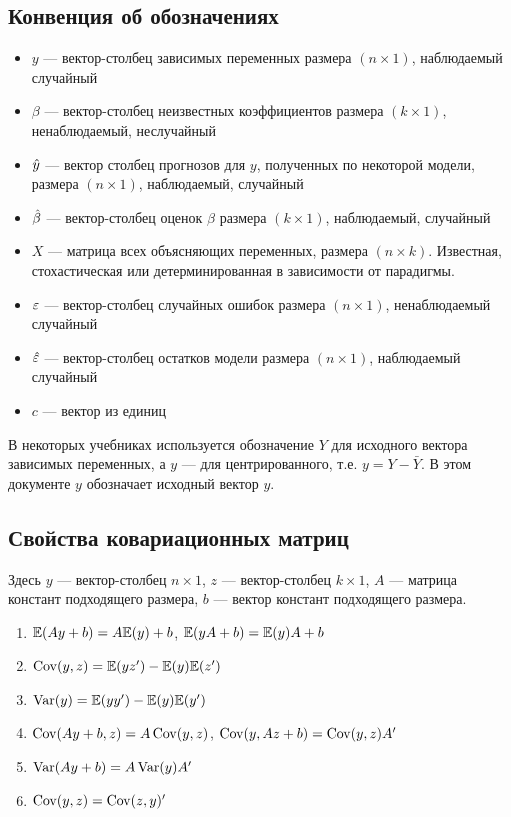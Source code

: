 \documentclass[12pt, a4paper]{article}
\begin{document}
\subsection{Конвенция об обозначениях}

\begin{itemize}
\item $y$ — вектор-столбец зависимых переменных размера $(n \times 1)$, наблюдаемый случайный

\item $\beta$ — вектор-столбец неизвестных коэффициентов размера $(k \times 1)$, ненаблюдаемый, неслучайный

\item $\hat{y}$ — вектор столбец прогнозов для $y$, полученных по некоторой модели, размера $(n \times 1)$, наблюдаемый, случайный

\item $\hat{\beta}$ — вектор-столбец оценок $\beta$ размера $(k \times 1)$, наблюдаемый, случайный

\item $X$ — матрица всех объясняющих переменных, размера $(n \times k)$. Известная, стохастическая или детерминированная в зависимости от парадигмы.

\item $\varepsilon$ — вектор-столбец случайных ошибок размера $(n \times 1)$, ненаблюдаемый случайный

\item $\hat{\varepsilon}$ — вектор-столбец остатков модели размера $(n \times 1)$, наблюдаемый случайный

\item $c$ — вектор из единиц
\end{itemize}

В некоторых учебниках используется обозначение $Y$ для исходного вектора зависимых переменных, а $y$ — для центрированного, т.е.  $y=Y-\bar{Y}$. В этом документе $y$ обозначает исходный вектор $y$.


\subsection{Свойства ковариационных матриц}

Здесь $y$ — вектор-столбец $n\times 1$, $z$ — вектор-столбец $k\times 1$, $A$ — матрица констант подходящего размера, $b$ — вектор констант подходящего размера.

\begin{enumerate}
\item $\mathbb{E}(Ay+b)=A\mathbb{E}(y)+b$, $\mathbb{E}(yA+b)=\mathbb{E}(y)A+b$
\item $\operatorname{Cov}(y, z) = \mathbb{E}(yz') - \mathbb{E}(y)\mathbb{E}(z')$
\item $\operatorname{Var}(y) = \mathbb{E}(yy') - \mathbb{E}(y)\mathbb{E}(y')$
\item $\operatorname{Cov}(Ay + b, z) = A\operatorname{Cov}(y, z)$, $\operatorname{Cov}(y, Az + b) = \operatorname{Cov}(y, z) A'$
\item $\operatorname{Var}(Ay+b)=A\operatorname{Var}(y)A'$
\item $\operatorname{Cov}(y,z)=\operatorname{Cov}(z,y)'$
\end{enumerate}
\end{document}
